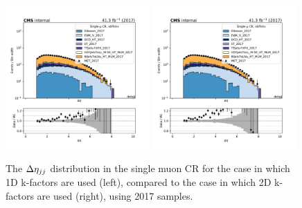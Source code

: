 \begin{figure}
    \begin{center}
        \includegraphics[width=0.49\textwidth]{fig/datamc/cr_1m_vbf/cr_1m_vbf_detajj_losf_2017.pdf}
        \includegraphics[width=0.49\textwidth]{fig/datamc_2dkfac/cr_1m_vbf/cr_1m_vbf_detajj_losf_2017.pdf} 
        \caption{The $\Delta \eta_{jj}$ distribution in the single muon CR for the case in which 1D k-factors are used (left), 
        compared to the case in which 2D k-factors are used (right), using 2017 samples.}
        \label{fig:detajj_2017}
    \end{center}
\end{figure}

